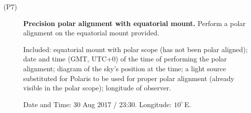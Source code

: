 \begin{description}
\item[(P7)] \textbf{Precision polar alignment with equatorial mount.} Perform
  a polar alignment on the equatorial mount provided.

  Included: equatorial mount with polar scope (has not been polar aligned);
  date and time (GMT, UTC+0) of the time of performing the polar alignment;
  diagram of the sky's position at the time; a light source substituted for
  Polaris to be used for proper polar alignment (already visible in the polar
  scope); longitude of observer.

  Date and Time: 30 Aug 2017 / 23:30. \quad Longitude: $10^\circ$\,E.
\end{description}

